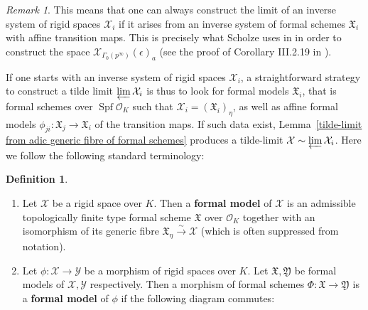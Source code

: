 \documentclass[10pt,oneside]{amsart}
\theoremstyle{definition}
\newtheorem{definition}[theorem]{Definition}
\theoremstyle{remark}
\newtheorem{remark}[theorem]{Remark}
\begin{document}
	\begin{remark}
	This means that one can always construct the limit of an inverse system of rigid spaces $\mathcal X_i$ if it arises from an inverse system of formal schemes $\mathfrak X_i$ with affine transition maps. This is precisely what Scholze uses in \cite{torsion} in order to construct the space $\mathcal X_{\Gamma_0(p^\infty)}(\epsilon)_a$ (see the proof of Corollary III.2.19 in \cite{torsion}).
	\end{remark}
	
	If one starts with an inverse system of rigid spaces $\mathcal X_i$, a straightforward strategy to construct a tilde limit $\varprojlim \mathcal X_i$ is thus to look for formal models $\mathfrak X_i$, that is formal schemes over $\operatorname{Spf} \mathcal O_K$ such that $\mathcal X_i = (\mathfrak X_i)_\eta$, as well as affine formal models $\phi_{ji}:\mathfrak X_j\rightarrow \mathfrak X_i$ of the transition maps. If such data exist, Lemma~\ref{tilde-limit from adic generic fibre of formal schemes} produces a tilde-limit $\mathcal X \sim \varprojlim \mathcal X_i$. Here we follow the following standard terminology:
	\begin{definition}
		\begin{enumerate}
			\item Let $\mathcal X$ be a rigid space over $K$. Then a \textbf{formal model} of $\mathcal X$ is an admissible topologically finite type formal scheme $\mathfrak X$ over $\mathcal O_K$ together with an isomorphism of its generic fibre $\mathfrak X_\eta \xrightarrow{\sim} \mathcal X$ (which is often suppressed from notation).
			\item Let $\phi:\mathcal X\rightarrow \mathcal Y$ be a morphism of rigid spaces over $K$. Let $\mathfrak X,\mathfrak Y$ be formal models of $\mathcal X,\mathcal Y$ respectively. Then a morphism of formal schemes $\Phi:\mathfrak X \rightarrow \mathfrak Y$ is a \textbf{formal model} of $\phi$ if the following diagram commutes:
			\begin{center}
			\end{center}
			
		\end{enumerate}
		
	\end{definition}	
 
\end{document}
